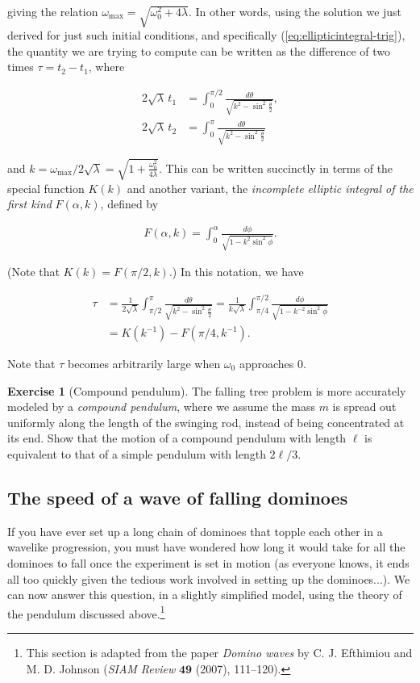 \documentclass[11pt]{report}
\theoremstyle{plain}
\theoremstyle{definition}
\newtheorem{xexercise}[thm]{Exercise}
\begin{document}
giving the relation
$\omega_{\textrm{max}} = \sqrt{\omega_0^2+4\lambda}$.
In other words, using the solution we just derived for
just such initial conditions, and specifically
(\ref{eq:ellipticintegral-trig}), the quantity we are
trying to compute can be written as the difference of
two times $\tau = t_2-t_1$, where

\begin{align*}
2 \sqrt{\lambda}\, t_1 &= \int_0^{\pi/2} \frac{d\theta}{\sqrt{k^2-\sin^2\tfrac{\theta}{2}}}, \\
2 \sqrt{\lambda}\, t_2 &= \int_0^{\pi} \frac{d\theta}{\sqrt{k^2-\sin^2\tfrac{\theta}{2}}}
\end{align*}

and
$k=\omega_{\textrm{max}}/2\sqrt{\lambda} =
\sqrt{1+\frac{\omega_0^2}{4\lambda}}$.
This can be written succinctly in terms of the special
function $K(k)$ and another variant, the \emph{incomplete
elliptic integral of the first kind} $F(\alpha, k)$,
defined by

\begin{align*}
F(\alpha,k) = \int_0^\alpha \frac{d\phi}{\sqrt{1-k^2 \sin^2 \phi}}.
\end{align*}

(Note that $K(k)=F(\pi/2,k)$.) In this notation, we
have

\begin{align*}
\tau &= \frac{1}{2\sqrt{\lambda}} \int_{\pi/2}^\pi \frac{d\theta}{\sqrt{k^2-\sin^2 \tfrac{\theta}{2}}}
= \frac{1}{k \sqrt{\lambda}} \int_{\pi/4}^{\pi/2} \frac{d\phi}{\sqrt{1-k^{-2}\sin^2 \phi}} \\ &=
K(k^{-1}) - F(\pi/4,k^{-1}).
\end{align*}

Note that $\tau$ becomes arbitrarily large when
$\omega_0$ approaches $0$.

\begin{xexercise}[Compound pendulum]
The falling tree problem is more accurately modeled
by a \emph{compound pendulum}, where we assume the mass $m$
is spread out uniformly along the length of the
swinging rod, instead of being concentrated at its
end. Show that the motion of a compound pendulum with
length $\ell$ is equivalent to that of a simple
pendulum with length $2\ell/3$.
\end{xexercise}

\subsection{The speed of a wave of falling dominoes}
If you have ever set up a long chain of dominoes that
topple each other in a wavelike progression, you must
have wondered how long it would take for all the
dominoes to fall once the experiment is set in motion
(as everyone knows, it ends all too quickly given the
tedious work involved in setting up the dominoes...).
We can now answer this question, in a slightly
simplified model, using the theory of the pendulum
discussed above.\footnote{This section is adapted from the paper \emph{Domino waves}
by C. J. Efthimiou and M. D. Johnson (\emph{SIAM Review}
$\textbf{49}$ (2007), 111--120).}
\end{document}
